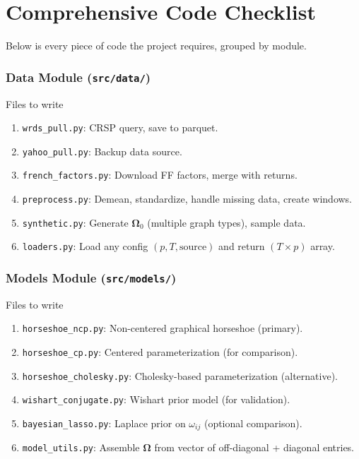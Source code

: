 \documentclass[11pt,a4paper]{article}
\newcommand{\bOmega}{\bm{\Omega}}
\begin{document}
\part{Comprehensive Code Checklist}

Below is every piece of code the project requires, grouped by module.

\section{Data Module (\texttt{src/data/})}

\begin{code}{Files to write}
\begin{enumerate}[nosep]
  \item \texttt{wrds\_pull.py}: CRSP query, save to parquet.
  \item \texttt{yahoo\_pull.py}: Backup data source.
  \item \texttt{french\_factors.py}: Download FF factors, merge with returns.
  \item \texttt{preprocess.py}: Demean, standardize, handle missing data, create windows.
  \item \texttt{synthetic.py}: Generate $\bOmega_0$ (multiple graph types), sample data.
  \item \texttt{loaders.py}: Load any config $(p, T, \text{source})$ and return $(T \times p)$ array.
\end{enumerate}
\end{code}

\section{Models Module (\texttt{src/models/})}

\begin{code}{Files to write}
\begin{enumerate}[nosep]
  \item \texttt{horseshoe\_ncp.py}: Non-centered graphical horseshoe (primary).
  \item \texttt{horseshoe\_cp.py}: Centered parameterization (for comparison).
  \item \texttt{horseshoe\_cholesky.py}: Cholesky-based parameterization (alternative).
  \item \texttt{wishart\_conjugate.py}: Wishart prior model (for validation).
  \item \texttt{bayesian\_lasso.py}: Laplace prior on $\omega_{ij}$ (optional comparison).
  \item \texttt{model\_utils.py}: Assemble $\bOmega$ from vector of off-diagonal + diagonal entries.
\end{enumerate}
\end{code}
\end{document}
